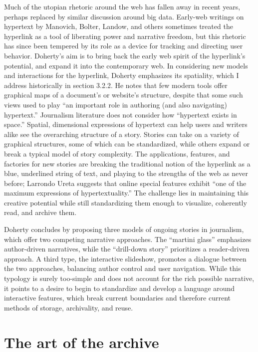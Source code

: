 Much of the utopian rhetoric around the web has fallen away in recent years, perhaps replaced by similar discussion around big data. Early-web writings on hypertext by Manovich, Bolter, Landow, and others sometimes treated the hyperlink as a tool of liberating power and narrative freedom, but this rhetoric has since been tempered by its role as a device for tracking and directing user behavior. Doherty's aim is to bring back the early web spirit of the hyperlink's potential, and expand it into the contemporary web. In considering new models and interactions for the hyperlink, Doherty emphasizes its spatiality, which I address historically in section 3.2.2. He notes that few modern tools offer graphical maps of a document's or website's structure, despite that some such views used to play ``an important role in authoring (and also navigating) hypertext.''\autocite{doherty_hypertext_2013} Journalism literature does not consider how ``hypertext exists in space.''\autocite{doherty_hypertext_2013} Spatial, dimensional expressions of hypertext can help users and writers alike see the overarching structure of a story. Stories can take on a variety of graphical structures, some of which can be standardized, while others expand or break a typical model of story complexity. The applications, features, and factories for new stories are breaking the traditional notion of the hyperlink as a blue, underlined string of text, and playing to the strengths of the web as never before; Larrondo Ureta suggests that online special features exhibit ``one of the maximum expressions of hypertextuality.''\autocite{doherty_hypertext_2014,ureta_potential_2011} The challenge lies in maintaining this creative potential while still standardizing them enough to visualize, coherently read, and archive them.

Doherty concludes by proposing three models of ongoing stories in journalism, which offer two competing narrative approaches. The ``martini glass'' emphasizes author-driven narratives, while the ``drill-down story'' prioritizes a reader-driven approach. A third type, the interactive slideshow, promotes a dialogue between the two approaches, balancing author control and user navigation. While this typology is surely too-simple and does not account for the rich possible narrative, it points to a desire to begin to standardize and develop a language around interactive features, which break current boundaries and therefore current methods of storage, archivality, and reuse.

\section{The art of the archive}

